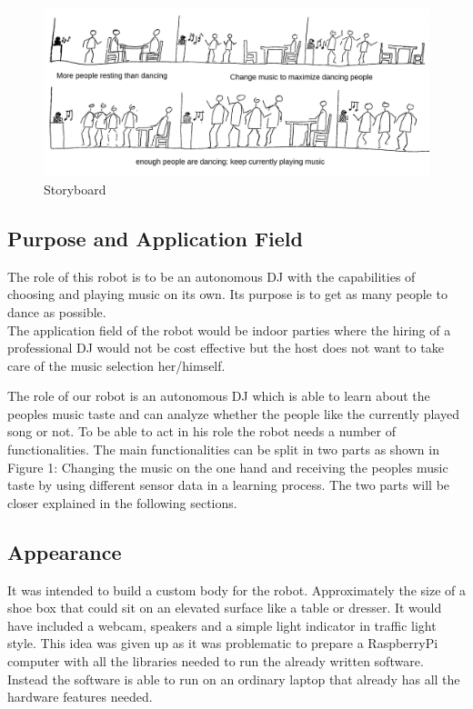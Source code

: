 \documentclass{article}
\begin{document}
\begin{figure}[ht!]
\centering
\includegraphics[scale=0.15]{storyboard.png}
\caption{Storyboard}
\label{fig:functionalities}
\end{figure}

\subsection{Purpose and Application Field}

The role of this robot is to be an autonomous DJ with the capabilities of choosing and playing music on its own. Its purpose is to get as many people to dance as possible. \\
The application field of the robot would be indoor parties where the hiring of a professional DJ would not be cost effective but the host does not want to take care of the music selection her/himself.

The role of our robot is an autonomous DJ which is able to learn about the peoples music taste and can analyze whether the people like the currently played song or not. To be able to act in his role the robot needs a number of functionalities. The main functionalities can be split in two parts as shown in Figure 1: Changing the music on the one hand and receiving the peoples music taste by using different sensor data in a learning process. The two parts will be closer explained in the following sections.

\subsection{Appearance}

It was intended to build a custom body for the robot. Approximately the size of a shoe box that could sit on an elevated surface like a table or dresser. It would have included a webcam, speakers and a simple light indicator in traffic light style. This idea was given up as it was problematic to prepare a RaspberryPi computer with all the libraries needed to run the already written software. Instead the software is able to run on an ordinary laptop that already has all the hardware features needed.
\end{document}
